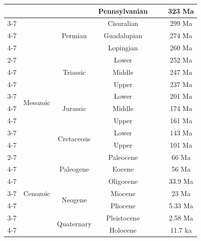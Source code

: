 \documentclass[border=50pt]{standalone}
\begin{document}
\begin{tabular}{|c|c|c|c|p{5cm}|p{10cm}|c|}
$$		\cline{4-7} 
		&&& Pennsylvanian & & & 323 Ma\\
		\cline{3-7} 
		&& \multirow{3}{*}{Permian} & Cisuralian & & & 299 Ma\\
		\cline{4-7} 
		&&& Guadalupian & & & 274 Ma\\
		\cline{4-7} 
		&&& Lopingian & & & 260 Ma\\
		\cline{2-7} 
		& \multirow{8}{*}{Mesozoic} & \multirow{3}{*}{Triassic} & Lower & & & 252 Ma\\
		\cline{4-7} 
		&&& Middle & & & 247 Ma\\
		\cline{4-7} 
		&&& Upper & & & 237 Ma\\
		\cline{3-7} 
		&& \multirow{3}{*}{Jurassic} & Lower & & & 201 Ma\\
		\cline{4-7} 
		&&& Middle & & & 174 Ma\\
		\cline{4-7} 
		&&& Upper & & & 161 Ma\\
		\cline{3-7} 
		&& \multirow{2}{*}{Cretaceous} & Lower & & & 143 Ma\\
		\cline{4-7} 
		&&& Upper & & & 101 Ma\\
		\cline{2-7} 
		& \multirow{7}{*}{Cenozoic} & \multirow{3}{*}{Paleogene} & Paleocene & & & 66 Ma\\
		\cline{4-7} 
		&&& Eocene & & & 56 Ma\\
		\cline{4-7} 
		&&& Oligocene & & & 33.9 Ma\\
		\cline{3-7} 
		&& \multirow{2}{*}{Neogene} & Miocene & & & 23 Ma\\
		\cline{4-7} 
		&&& Pliocene & & & 5.33 Ma\\
		\cline{3-7} 
		&& \multirow{2}{*}{Quaternary} & Pleistocene & & & 2.58 Ma\\
		\cline{4-7} 
		&&& Holocene & & & 11.7 ka\\
		\hline
	\end{tabular}
\end{document}
